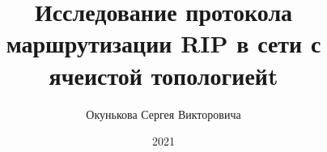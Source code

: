 \documentclass[bachelor, och, labwork]{shiza}
\begin{document}
\chair{}

\title{Исследование протокола маршрутизации RIP в сети с ячеистой топологиейt}






\author{Окунькова Сергея Викторовича}








\date{2021}

\maketitle

\end{document}
